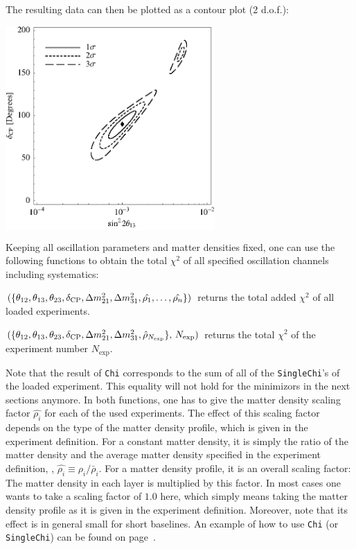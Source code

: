 {The resulting data can then be plotted as a contour plot (2 d.o.f.):
\begin{center}
\colorbox{white}{\includegraphics[width=8cm]{correx}}
\end{center}

}

Keeping all oscillation parameters and matter densities fixed, one can use the following functions to obtain the total $\chi^2$ of all specified oscillation channels including systematics:
\begin{function} 
$(\{ \theta_{12}, \theta_{13}, \theta_{23}, \delta_{\mathrm{CP}} , \Delta m_{21}^2 , \Delta m_{31}^2, \hat{\rho_1}, \hdots , \hat{\rho_n} \})$  returns the total added $\chi^2$ of all loaded experiments.
\end{function}
\begin{function}
 $(\{ \theta_{12}, \theta_{13}, \theta_{23}, \delta_{\mathrm{CP}} , \Delta m_{21}^2 , \Delta m_{31}^2, \hat{\rho}_{N_{\mathrm{exp}}} \}, \, N_{\mathrm{exp}} )$  returns the total $\chi^2$ of the experiment number $N_{\mathrm{exp}}$.
\end{function}
Note that the result of {\tt Chi} corresponds to the sum of all of the {\tt SingleChi}'s of the loaded experiment. This equality will not hold for the minimizors in the next sections anymore. In both functions, one has to give the matter density scaling factor $\hat{\rho_i}$ for each of the used experiments. The effect of this scaling factor depends on the type of the matter density profile, which is given in the  experiment definition. For a constant matter density, it is simply the ratio of the matter density and the average matter density specified in the experiment definition, \ie , $\hat{\rho_i} \equiv \rho_i/\bar{\rho}_i$. For a matter density profile, it is an overall scaling factor: The matter density in each layer is multiplied by this factor. In most cases one wants to take a scaling factor of $1.0$ here, which simply means taking the matter density profile as it is given in the experiment definition. Moreover, note that its effect is in general small for short baselines. An example of how to use  {\tt Chi} (or {\tt SingleChi}) can be found on page~\pageref{ex:corrth13dcp}.  


